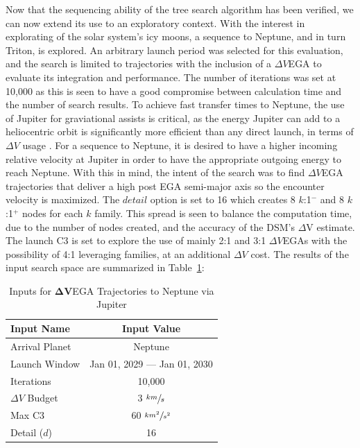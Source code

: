 \documentclass[letterpaper, preprint, paper,11pt]{AAS}	%
\begin{document}
Now that the sequencing ability of the tree search algorithm has been verified, we can now extend its use to an exploratory context. With the interest in explorating of the solar system's icy moons, a sequence to Neptune, and in turn Triton, is explored\cite{Hubbard2010}. An arbitrary launch period was selected for this evaluation, and the search is limited to trajectories with the inclusion of a $\Delta V$EGA to evaluate its integration and performance. The number of iterations was set at 10,000 as this is seen to have a good compromise between calculation time and the number of search results. To achieve fast transfer times to Neptune, the use of Jupiter for graviational assists is critical, as the energy Jupiter can add to a heliocentric orbit is significantly more efficient than any direct launch, in terms of $\Delta V$ usage \cite{Landau2010}. For a sequence to Neptune, it is desired to have a higher incoming relative velocity at Jupiter in order to have the appropriate outgoing energy to reach Neptune. With this in mind, the intent of the search was to find $\Delta V$EGA trajectories that deliver a high post EGA semi-major axis so the encounter velocity is maximized. The $\textit{detail}$ option is set to 16 which creates 8 $k$:1$^{-}$ and 8 $k$:1$^{+}$ nodes for each $k$ family. This spread is seen to balance the computation time, due to the number of nodes created, and the accuracy of the DSM's $\Delta$V estimate. The launch C3 is set to explore the use of mainly 2:1 and 3:1 $\Delta V$EGAs with the possibility of 4:1 leveraging families, at an additional $\Delta V$ cost. The results of the input search space are summarized in Table~\ref{tab:tritonInputs}:

\begin{table}[h]
    \begin{center}
        \caption{Inputs for $\boldsymbol{\Delta V}$EGA Trajectories to Neptune via Jupiter}
        \label{tab:tritonInputs}
        \begin{tabular}{lc}
            \toprule
            \textbf{Input Name} & \textbf{Input Value}\\
            \hline
            Arrival Planet & Neptune \\
            Launch Window \quad \quad & Jan 01, 2029 --- Jan 01, 2030 \\
            Iterations & 10,000 \\
            $\Delta V$ Budget & 3 $\sfrac{km}{s}$ \\
            Max C3 & 60 $\sfrac{km^2}{s^2}$ \\
            Detail ($d$) & 16 \\
            \bottomrule
        \end{tabular}
    \end{center}
\end{table}
\end{document}
